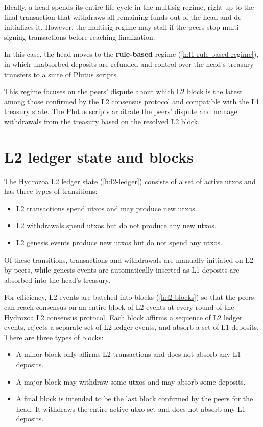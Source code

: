 \documentclass[../hydrozoa.tex]{subfiles}
\begin{document}
Ideally, a head spends its entire life cycle in the multisig regime, right up to the final transaction that withdraws all remaining funds out of the head and de-initializes it.
However, the multisig regime may stall if the peers stop multi-signing transactions before reaching finalization.

In this case, the head moves to the \textbf{rule-based} regime (\cref{h:l1-rule-based-regime}), in which unabsorbed deposits are refunded and control over the head's treasury transfers to a suite of Plutus scripts.

This regime focuses on the peers' dispute about which L2 block is the latest among those confirmed by the L2 consensus protocol and compatible with the L1 treasury state.
The Plutus scripts arbitrate the peers' dispute and manage withdrawals from the treasury based on the resolved L2 block.

\section*{L2 ledger state and blocks}%
\label{h:overview-l2-ledger-state-and-blocks}%
%

The Hydrozoa L2 ledger state (\cref{h:l2-ledger}) consists of a set of active utxos and has three types of transitions:
\begin{itemize}
  \item L2 transactions spend utxos and may produce new utxos.
  \item L2 withdrawals spend utxos but do not produce any new utxos.
  \item L2 genesis events produce new utxos but do not spend any utxos.
\end{itemize}

Of these transitions, transactions and withdrawals are manually initiated on L2 by peers, while genesis events are automatically inserted as L1 deposits are absorbed into the head's treasury.

For efficiency, L2 events are batched into blocks (\cref{h:l2-blocks}) so that the peers can reach consensus on an entire block of L2 events at every round of the Hydrozoa L2 consensus protocol.
Each block affirms a sequence of L2 ledger events, rejects a separate set of L2 ledger events, and absorb a set of L1 deposits.
There are three types of blocks:
\begin{itemize}
  \item A minor block only affirms L2 transactions and does not absorb any L1 deposits.
  \item A major block may withdraw some utxos and may absorb some deposits.
  \item A final block is intended to be the last block confirmed by the peers for the head. It withdraws the entire active utxo set and does not absorb any L1 deposits.
\end{itemize}
\end{document}

